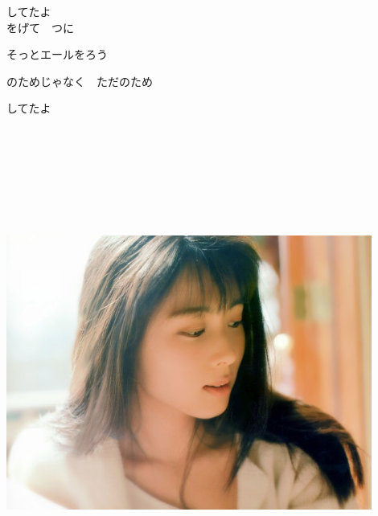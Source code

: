 {してたよ
\\

をげて　つに

そっとエールをろう

のためじゃなく　ただのため

してたよ

{ \ }

{ \ }

{ \ }

{ \ }

\includegraphics[width=0.9\textwidth]{P1.jpg}
}